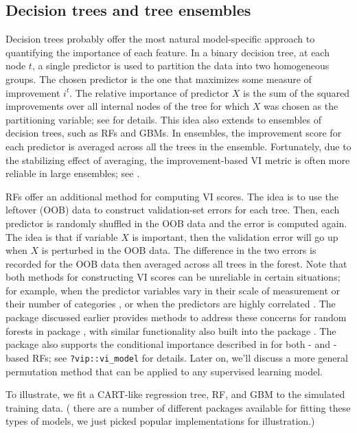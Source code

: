 \subsection{Decision trees and tree ensembles}

Decision trees probably offer the most natural model-specific approach
to quantifying the importance of each feature. In a binary decision
tree, at each node \(t\), a single predictor is used to partition the
data into two homogeneous groups. The chosen predictor is the one that
maximizes some measure of improvement \(i^t\). The relative importance
of predictor \(X\) is the sum of the squared improvements over all
internal nodes of the tree for which \(X\) was chosen as the
partitioning variable; see \citet{classification-breiman-1984} for
details. This idea also extends to ensembles of decision trees, such as
RFs and GBMs. In ensembles, the improvement score for each predictor is
averaged across all the trees in the ensemble. Fortunately, due to the
stabilizing effect of averaging, the improvement-based VI metric is
often more reliable in large ensembles; see
\citet[p. 368]{hastie-elements-2009}.

RFs offer an additional method for computing VI scores. The idea is to
use the leftover  (OOB) data to construct validation-set
errors for each tree. Then, each predictor is randomly shuffled in the
OOB data and the error is computed again. The idea is that if variable
\(X\) is important, then the validation error will go up when \(X\) is
perturbed in the OOB data. The difference in the two errors is recorded
for the OOB data then averaged across all trees in the forest. Note that
both methods for constructing VI scores can be unreliable in certain
situations; for example, when the predictor variables vary in their
scale of measurement or their number of categories \citep{party2007a},
or when the predictors are highly correlated
\citep{strobl-2019-conditional}. The  package discussed
earlier provides methods to address these concerns for random forests in
package , with similar functionality also built into the
 package \citep{R-partykit}. The  package
also supports the conditional importance described in
\citep{strobl-2019-conditional} for both - and
-based RFs; see \texttt{?vip::vi\_model} for details.
Later on, we'll discuss a more general permutation method that can be
applied to any supervised learning model.

To illustrate, we fit a CART-like regression tree, RF, and GBM to the
simulated training data. ( there are a number of different
packages available for fitting these types of models, we just picked
popular implementations for illustration.)

